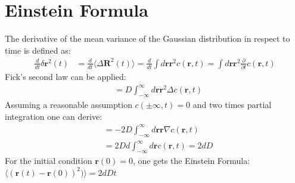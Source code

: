 \documentclass[
  a4paper,BCOR10mm,twoside,
  headsepline,footsepline,%
  fleqn,openbib
]{scrbook}
\begin{document}
\section{Einstein Formula} \label{einsteinrealtionappendix}
The derivative of the mean variance of the Gaussian distribution in respect to time is defined as:
\begin{align}
 \frac{d}{dt}  \delta \bm{r}^2(t)&=\frac{d}{dt} \langle \Delta \bm{ R}^2(t)\rangle  =\frac{d}{dt} \int d\bm{r} \bm{r}^2 c(\bm{r},t)=\int d\bm{r} \bm{r}^2 \frac{\partial}{\partial t} c(\bm{r},t) 
\end{align}
Fick's second law can be applied:
\begin{align}
&= D \int_{-\infty}^{\infty}d\bm{r} \bm{r}^2 \Delta c(\bm{r},t)  
\end{align}
Assuming a reasonable assumption  $c(\pm \infty,t)=0$  and two times partial integration one can derive:
\begin{align}
&= -2 D \int_{-\infty}^{\infty} d\bm{r} \bm{r} \nabla c(\bm{r},t) \\ &= 2 D d \int_{-\infty}^{\infty} d\bm{r} c(\bm{r},t) =2dD
\end{align}
For the initial condition $\bm{r}(0) = 0$,  one gets the Einstein Formula: $\langle (\bm{r}(t)-\bm{r}(0))^2)\rangle= 2dDt$
\end{document}
